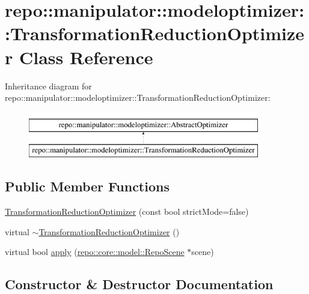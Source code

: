 \hypertarget{classrepo_1_1manipulator_1_1modeloptimizer_1_1_transformation_reduction_optimizer}{}\section{repo\+:\+:manipulator\+:\+:modeloptimizer\+:\+:Transformation\+Reduction\+Optimizer Class Reference}
\label{classrepo_1_1manipulator_1_1modeloptimizer_1_1_transformation_reduction_optimizer}
Inheritance diagram for repo\+:\+:manipulator\+:\+:modeloptimizer\+:\+:Transformation\+Reduction\+Optimizer\+:\begin{figure}[H]
\begin{center}
\leavevmode
\includegraphics[height=2.000000cm]{classrepo_1_1manipulator_1_1modeloptimizer_1_1_transformation_reduction_optimizer}
\end{center}
\end{figure}
\subsection*{Public Member Functions}
\begin{DoxyCompactItemize}
\item 
\hyperlink{classrepo_1_1manipulator_1_1modeloptimizer_1_1_transformation_reduction_optimizer_aea2109a4102521b4d627356c004daad3}{Transformation\+Reduction\+Optimizer} (const bool strict\+Mode=false)
\item 
virtual \hyperlink{classrepo_1_1manipulator_1_1modeloptimizer_1_1_transformation_reduction_optimizer_a79f21ae816e937b6e3a3c9ceacb7b29f}{$\sim$\+Transformation\+Reduction\+Optimizer} ()
\item 
virtual bool \hyperlink{classrepo_1_1manipulator_1_1modeloptimizer_1_1_transformation_reduction_optimizer_ab1e06e1810e27b99030cf1d86c1b4e06}{apply} (\hyperlink{classrepo_1_1core_1_1model_1_1_repo_scene}{repo\+::core\+::model\+::\+Repo\+Scene} $\ast$scene)
\end{DoxyCompactItemize}


\subsection{Constructor \& Destructor Documentation}
\hypertarget{classrepo_1_1manipulator_1_1modeloptimizer_1_1_transformation_reduction_optimizer_aea2109a4102521b4d627356c004daad3}{}
